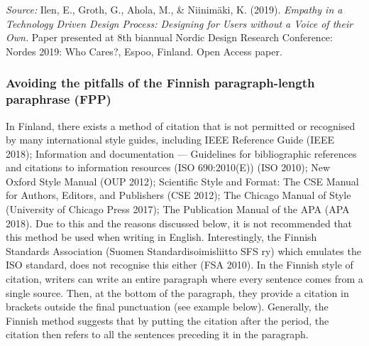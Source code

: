 \documentclass[english, 12pt, a4paper, biz, utf8, a-2b, online]{aaltothesis}
\begin{document}
\vspace{1ex}
\noindent
{}

\vspace{1ex}
\noindent
\textit{Source:} Ilen, E., Groth, G., Ahola, M., \& Niinimäki, K. (2019). 
\textit{Empathy in a Technology Driven Design Process: Designing for Users 
	without a Voice of their Own.} Paper presented at 8th biannual Nordic Design
	Research Conference: Nordes 2019: Who Cares?, Espoo, Finland. Open Access 
	paper.


\subsubsection*{Avoiding the pitfalls of the Finnish paragraph-length paraphrase
	 (FPP)}

In Finland, there exists a method of citation that is not permitted or 
recognised by many international style guides, including IEEE Reference Guide 
(IEEE 2018); Information and documentation --- Guidelines for bibliographic 
references and citations to information resources (ISO 690:2010(E)) (ISO 2010); 
New Oxford Style Manual (OUP 2012); Scientific Style and Format: The CSE Manual 
for Authors, Editors, and Publishers (CSE 2012); The Chicago Manual of Style 
(University of Chicago Press 2017); The Publication Manual of the APA (APA 
2018). Due to this and the reasons discussed below, it is not recommended that 
this method be used when writing in English. Interestingly, the Finnish 
Standards Association (Suomen Standardisoimisliitto SFS ry) which emulates the 
ISO standard, does not recognise this either (FSA 2010). In the Finnish style of
citation, writers can write an entire paragraph where every sentence comes from 
a single source. Then, at the bottom of the paragraph, they provide a citation 
in brackets outside the final punctuation (see example below). Generally, the 
Finnish method suggests that by putting the citation after the period, the 
citation then refers to all the sentences preceding it in the paragraph.
\end{document}
